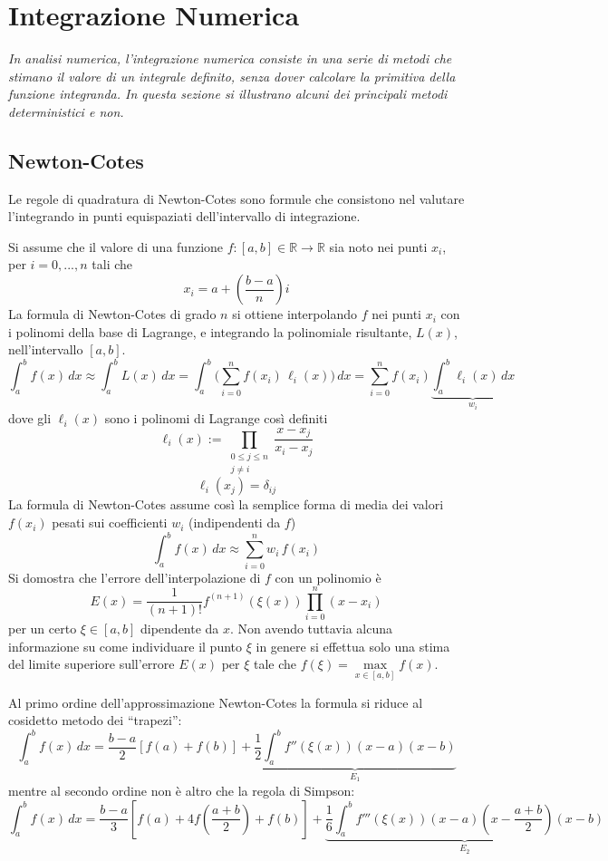 \chapter{\huge Integrazione Numerica}

\textit{In analisi numerica, l'integrazione numerica consiste in una serie di metodi che stimano il valore di un integrale definito, senza dover calcolare la primitiva della funzione integranda. In questa sezione si illustrano alcuni dei principali metodi deterministici e non.}

\section{Newton-Cotes}
Le regole di quadratura di Newton-Cotes sono formule che consistono nel valutare l'integrando in punti equispaziati dell'intervallo di integrazione.

Si assume che il valore di una funzione $f:[a,b]\in\mathbb{R}\rightarrow\mathbb{R}$ sia noto nei punti $x_i$, per $i=0,...,n$ tali che $$x_i=a+\left(\frac{b-a}{n}\right)i$$
La formula di Newton-Cotes di grado $n$ si ottiene interpolando $f$ nei punti $x_i$ con i polinomi della base di Lagrange, e integrando la polinomiale risultante, $L(x)$, nell'intervallo $[a,b]$.
$$ \int_a^b f(x) \,dx \approx \int_a^b L(x)\,dx = \int_a^b \bigl( \sum_{i=0}^n f(x_i)\, \ell_i(x) \bigr) \, dx = \sum_{i=0}^n f(x_i) \underbrace{\int_a^b \ell_i(x)\, dx}_{w_i} $$
dove gli $\ell_i(x)$ sono i polinomi di Lagrange così definiti
$$\ell_i(x):= \prod_{\begin{smallmatrix}0\le j\le n\\ j\neq i\end{smallmatrix}} \frac{x-x_j}{x_i-x_j}$$$$\ell_i(x_j)=\delta_{ij}$$
La formula di Newton-Cotes assume così la semplice forma di media dei valori $f(x_i)$ pesati sui coefficienti $w_i$ (indipendenti da $f$)
$$\int_a^b f(x) \,dx \approx \sum_{i=0}^n w_i\, f(x_i)$$
Si domostra che l'errore dell'interpolazione di $f$ con un polinomio è
$$E(x)=\frac{1}{(n+1)!}f^{(n+1)}(\xi(x))\prod_{i=0}^n(x-x_i)$$
per un certo $\xi\in[a,b]$ dipendente da $x$. Non avendo tuttavia alcuna informazione su come individuare il punto $\xi$ in genere si effettua solo una stima del limite superiore sull'errore $E(x)$ per $\xi$ tale che $f(\xi) = \underset{x\in[a,b]}{\max}f(x)$.

Al primo ordine dell'approssimazione Newton-Cotes la formula si riduce al cosidetto metodo dei ``trapezi'':
$$\int_a^b f(x) \,dx=\frac{b-a}{2}\left[ f(a)+f(b)\right] + \underbrace{\frac{1}{2}\int_a^b f''(\xi(x))(x-a)(x-b)}_{E_1}$$
mentre al secondo ordine non è altro che la regola di Simpson:
$$\int_a^b f(x) \,dx=\frac{b-a}{3}\left[f(a)+4f(\frac{a+b}{2})+f(b)\right] + \underbrace{\frac{1}{6}\int_a^b f'''(\xi(x))(x-a)(x-\frac{a+b}{2})(x-b)}_{E_2}$$

